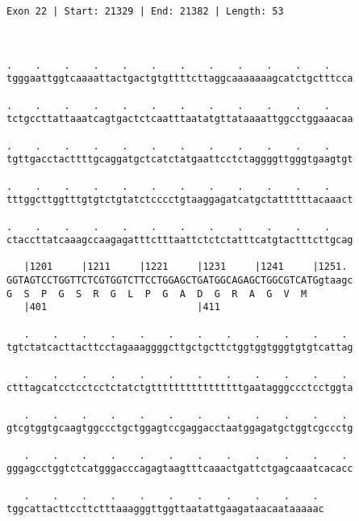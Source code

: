 \documentclass{article}
\begin{document}
\begin{Verbatim}
Exon 22 | Start: 21329 | End: 21382 | Length: 53



.    .    .    .    .    .    .    .    .    .    .    .    
tgggaattggtcaaaattactgactgtgttttcttaggcaaaaaaagcatctgctttcca
                                                            
.    .    .    .    .    .    .    .    .    .    .    .    
tctgccttattaaatcagtgactctcaatttaatatgttataaaattggcctggaaacaa
                                                            
.    .    .    .    .    .    .    .    .    .    .    .    
tgttgacctacttttgcaggatgctcatctatgaattcctctaggggttgggtgaagtgt
                                                            
.    .    .    .    .    .    .    .    .    .    .    .    
tttggcttggtttgtgtctgtatctcccctgtaaggagatcatgctattttttacaaact
                                                            
.    .    .    .    .    .    .    .    .    .    .    .    
ctaccttatcaaagccaagagatttctttaattctctctatttcatgtactttcttgcag
                                                            
   |1201     |1211     |1221     |1231     |1241     |1251. 
GGTAGTCCTGGTTCTCGTGGTCTTCCTGGAGCTGATGGCAGAGCTGGCGTCATGgtaagc
G  S  P  G  S  R  G  L  P  G  A  D  G  R  A  G  V  M        
   |401                          |411                       
  
   .    .    .    .    .    .    .    .    .    .    .    . 
tgtctatcacttacttcctagaaaggggcttgctgcttctggtggtgggtgtgtcattag
                                                            
   .    .    .    .    .    .    .    .    .    .    .    . 
ctttagcatcctcctcctctatctgttttttttttttttttgaatagggccctcctggta
                                                            
   .    .    .    .    .    .    .    .    .    .    .    . 
gtcgtggtgcaagtggccctgctggagtccgaggacctaatggagatgctggtcgccctg
                                                            
   .    .    .    .    .    .    .    .    .    .    .    . 
gggagcctggtctcatgggacccagagtaagtttcaaactgattctgagcaaatcacacc
                                                            
   .    .    .    .    .    .    .    .    .    .    . 
tggcattacttccttctttaaagggttggttaatattgaagataacaataaaaac
                                                       

\end{Verbatim}
\end{document}
